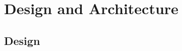 \chapter{Design and Architecture}\label{chapter-design-and-architecture}
\section{Design}\label{section-design}







